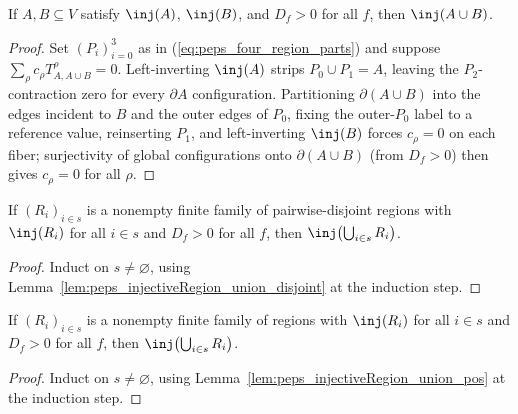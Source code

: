 \begin{lemma}%
    \label{lem:peps_injectiveRegion_union_pos}
    \leanok
    If $A,B\subseteq V$ satisfy $\inj(A)$, $\inj(B)$, and $D_f>0$ for all $f$,
    then $\inj(A\cup B)$.
\end{lemma}
\begin{proof}\leanok
    Set $(P_i)_{i=0}^3$ as in (\ref{eq:peps_four_region_parts}) and suppose
    $\sum_\rho c_\rho T_{A,A\cup B}^\rho=0$. Left-inverting $\inj(A)$ strips
    $P_0\cup P_1=A$, leaving the $P_2$-contraction zero for every $\partial A$
    configuration. Partitioning $\partial(A\cup B)$ into the edges incident to
    $B$ and the outer edges of $P_0$, fixing the outer-$P_0$ label to a
    reference value, reinserting $P_1$, and left-inverting $\inj(B)$ forces
    $c_\rho=0$ on each fiber; surjectivity of global configurations onto
    $\partial(A\cup B)$ (from $D_f>0$) then gives $c_\rho=0$ for all $\rho$.
\end{proof}

\begin{lemma}%
    \label{lem:peps_injectiveRegion_biUnion_disjoint}
    \leanok
    If $(R_i)_{i\in s}$ is a nonempty finite family of pairwise-disjoint regions
    with $\inj(R_i)$ for all $i\in s$ and $D_f>0$ for all $f$, then
    $\inj\bigl(\bigcup_{i\in s} R_i\bigr)$.
\end{lemma}
\begin{proof}\leanok
    Induct on $s\neq\varnothing$, using
    Lemma~\ref{lem:peps_injectiveRegion_union_disjoint} at the induction step.
\end{proof}

\begin{lemma}%
    \label{lem:peps_injectiveRegion_biUnion}
    \leanok
    If $(R_i)_{i\in s}$ is a nonempty finite family of regions with $\inj(R_i)$
    for all $i\in s$ and $D_f>0$ for all $f$, then
    $\inj\bigl(\bigcup_{i\in s} R_i\bigr)$.
\end{lemma}
\begin{proof}\leanok
    Induct on $s\neq\varnothing$, using
    Lemma~\ref{lem:peps_injectiveRegion_union_pos} at the induction step.
\end{proof}

